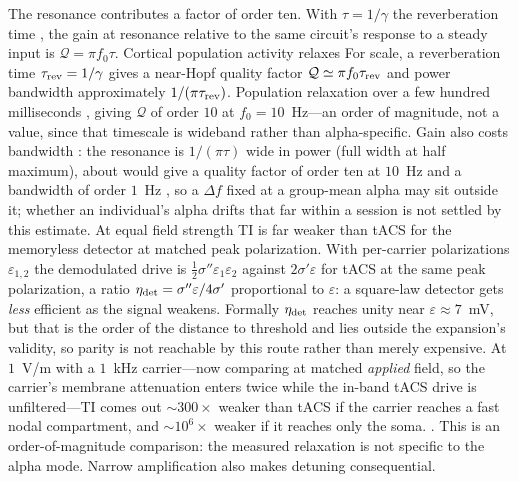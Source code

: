 \documentclass[11pt,a4paper]{article}
\newcommand{\Sig}{\sigma}
\newcommand{\half}{\tfrac{1}{2}}
\providecommand{\DIFaddtex}[1]{{\protect\color{blue} \sf #1}} %
\providecommand{\DIFdeltex}[1]{{\protect\color{red} \scriptsize #1}} %
\providecommand{\DIFaddbegin}{} %
\providecommand{\DIFaddend}{} %
\providecommand{\DIFdelbegin}{} %
\providecommand{\DIFdelend}{} %
\providecommand{\DIFadd}[1]{\texorpdfstring{\DIFaddtex{#1}}{#1}} %
\providecommand{\DIFdel}[1]{\texorpdfstring{\DIFdeltex{#1}}{}} %
\begin{document}
\DIFdelbegin \DIFdel{The resonance contributes a factor of order ten. With $\tau=1/\gamma$ the reverberation time , the
gain at resonance relative to the same circuit's response to a steady input is
$\mathcal{Q}=\pi f_0\tau$. Cortical population activity relaxes }\DIFdelend \DIFaddbegin \DIFadd{For scale, a reverberation time $\tau_{\rm rev}=1/\gamma$ gives a near-Hopf
quality factor $\mathcal Q\simeq\pi f_0\tau_{\rm rev}$ and power bandwidth
approximately $1/(\pi\tau_{\rm rev})$. Population relaxation }\DIFaddend over a few hundred
milliseconds \cite{wilting2018} \DIFdelbegin \DIFdel{, giving $\mathcal{Q}$ of order $10$ at
$f_0=10$~Hz---an
order of magnitude, not a value, since that timescale is wideband rather than
alpha-specific. Gain also costs bandwidth : the resonance is $1/(\pi\tau)$ wide in power (full width at
half maximum), about }\DIFdelend \DIFaddbegin \DIFadd{would give a quality factor of order ten at
$10$~Hz and a bandwidth of order }\DIFaddend $1$~Hz\DIFdelbegin \DIFdel{, so a $\Delta f$ fixed at a group-mean alpha may sit outside
it; whether an individual's alpha drifts that far within a session is not settled by this
estimate. At equal field strength TI is far weaker than tACS for the memoryless detector at
matched peak polarization. With per-carrier polarizations $\varepsilon_{1,2}$ the
demodulated drive is
$\half\Sig''\varepsilon_1\varepsilon_2$ against $2\Sig'\varepsilon$ for tACS at the same
peak polarization, a ratio $\eta_{\rm det}=\Sig''\varepsilon/4\Sig'$ proportional to
$\varepsilon$:
a square-law detector gets \emph{less} efficient as the signal weakens.
Formally $\eta_{\rm det}$ reaches unity near $\varepsilon\approx7$~mV, but that is the order of the
distance to threshold and lies outside the expansion's validity, so parity is not reachable
by this route rather than merely expensive. At $1$~V/m with a $1$~kHz carrier---now
comparing at matched \emph{applied} field, so the carrier's membrane attenuation enters
twice while the in-band tACS drive is unfiltered---TI comes out $\sim 300\times$ weaker
than tACS if the carrier reaches a fast nodal compartment, and $\sim 10^6\times$ weaker if
it reaches only the soma. }\DIFdelend \DIFaddbegin \DIFadd{. This is an order-of-magnitude comparison:
the measured relaxation is not specific to the alpha mode. Narrow amplification
also makes detuning consequential.
}\DIFaddend
\end{document}
